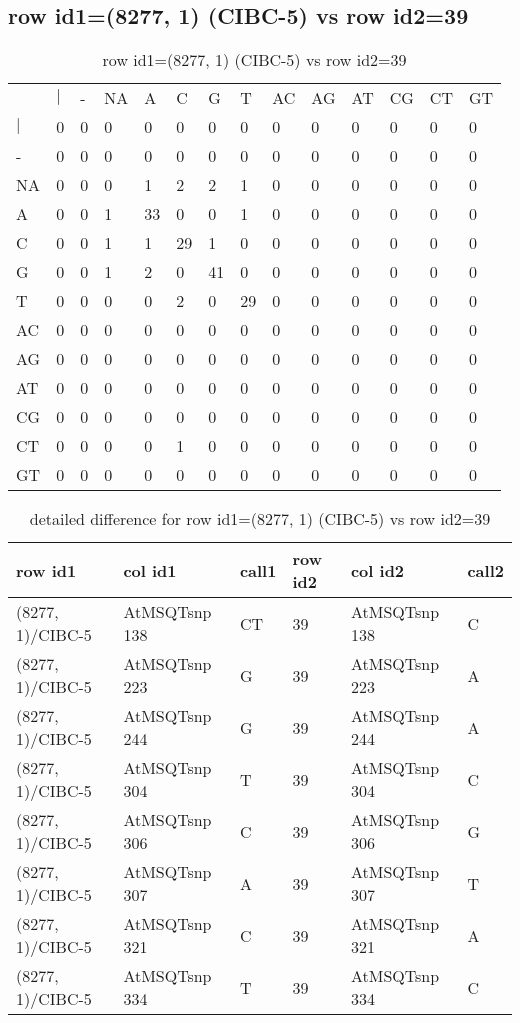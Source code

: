 \subsection{row id1=(8277, 1) (CIBC-5) vs row id2=39}
\begin{center}
\begin{longtable}{|l|l|l|l|l|l|l|l|l|l|l|l|l|l|}
\caption{row id1=(8277, 1) (CIBC-5) vs row id2=39} \label{table_dm236}\\
\hline
\\
\hline
&$|$&-&NA&A&C&G&T&AC&AG&AT&CG&CT&GT\\
$|$&0&0&0&0&0&0&0&0&0&0&0&0&0\\
-&0&0&0&0&0&0&0&0&0&0&0&0&0\\
NA&0&0&0&1&2&2&1&0&0&0&0&0&0\\
A&0&0&1&33&0&0&1&0&0&0&0&0&0\\
C&0&0&1&1&29&1&0&0&0&0&0&0&0\\
G&0&0&1&2&0&41&0&0&0&0&0&0&0\\
T&0&0&0&0&2&0&29&0&0&0&0&0&0\\
AC&0&0&0&0&0&0&0&0&0&0&0&0&0\\
AG&0&0&0&0&0&0&0&0&0&0&0&0&0\\
AT&0&0&0&0&0&0&0&0&0&0&0&0&0\\
CG&0&0&0&0&0&0&0&0&0&0&0&0&0\\
CT&0&0&0&0&1&0&0&0&0&0&0&0&0\\
GT&0&0&0&0&0&0&0&0&0&0&0&0&0\\
\hline
\end{longtable}
\end{center}

\begin{center}
\begin{longtable}{|l|l|l|l|l|l|}
\caption{detailed difference for row id1=(8277, 1) (CIBC-5) vs row id2=39} \label{table_dm237}\\
\hline
row id1&col id1&call1&row id2&col id2&call2\\
\hline
(8277, 1)/CIBC-5&AtMSQTsnp 138&CT&39&AtMSQTsnp 138&C\\
(8277, 1)/CIBC-5&AtMSQTsnp 223&G&39&AtMSQTsnp 223&A\\
(8277, 1)/CIBC-5&AtMSQTsnp 244&G&39&AtMSQTsnp 244&A\\
(8277, 1)/CIBC-5&AtMSQTsnp 304&T&39&AtMSQTsnp 304&C\\
(8277, 1)/CIBC-5&AtMSQTsnp 306&C&39&AtMSQTsnp 306&G\\
(8277, 1)/CIBC-5&AtMSQTsnp 307&A&39&AtMSQTsnp 307&T\\
(8277, 1)/CIBC-5&AtMSQTsnp 321&C&39&AtMSQTsnp 321&A\\
(8277, 1)/CIBC-5&AtMSQTsnp 334&T&39&AtMSQTsnp 334&C\\
\hline
\end{longtable}
\end{center}

